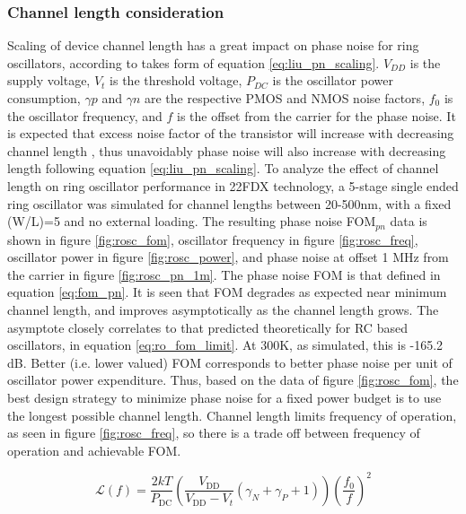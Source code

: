 \subsubsection{Channel length consideration}
	Scaling of device channel length has a great impact on phase noise for ring oscillators, according to \cite{Liu2020} takes form of equation \ref{eq:liu_pn_scaling}. $V_{DD}$ is the supply voltage, $V_t$ is the threshold voltage, $P_{DC}$ is the oscillator power consumption, $\gamma p$ and $\gamma n$ are the respective PMOS and NMOS noise factors, $f_0$ is the oscillator frequency, and $f$ is the offset from the carrier for the phase noise. It is expected that excess noise factor of the transistor will increase with decreasing channel length \cite{Antonopoulos2013}, thus unavoidably phase noise will also increase with decreasing length following equation \ref{eq:liu_pn_scaling}. To analyze the effect of channel length on ring oscillator performance in 22FDX technology, a 5-stage single ended ring oscillator was simulated for channel lengths between 20-500nm, with a fixed (W/L)=5 and no external loading. The resulting phase noise FOM$_{pn}$ data is shown in figure \ref{fig:rosc_fom}, oscillator frequency in figure \ref{fig:rosc_freq}, oscillator power in figure \ref{fig:rosc_power}, and phase noise at offset 1 MHz from the carrier in figure \ref{fig:rosc_pn_1m}. The phase noise FOM is that defined in equation \ref{eq:fom_pn}. It is seen that FOM degrades as expected near minimum channel length, and improves asymptotically as the channel length grows. The asymptote closely correlates to that predicted theoretically for RC based oscillators, in equation \ref{eq:ro_fom_limit}. At 300K, as simulated, this is -165.2 dB. Better (i.e. lower valued) FOM corresponds to better phase noise per unit of oscillator power expenditure. Thus, based on the data of figure \ref{fig:rosc_fom}, the best design strategy to minimize phase noise for a fixed power budget is to use the longest possible channel length. Channel length limits frequency of operation, as seen in figure \ref{fig:rosc_freq}, so there is a trade off between frequency of operation and achievable FOM. 

	\begin{equation} \label{eq:liu_pn_scaling}
		\mathcal {L}(f) =\frac {2kT}{P_{\textrm {DC}}}\left ({\frac {V_{\textrm {DD}}}{V_{\textrm {DD}}-V_{t}} (\gamma _{N}+\gamma _{P}+1)}\right)\left ({\frac {f_{0}}{f}}\right)^{2}
	\end{equation}

